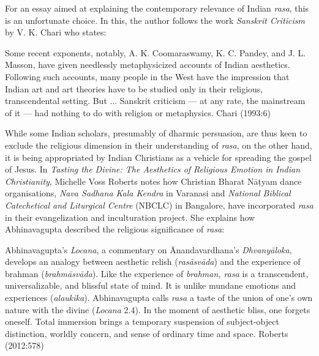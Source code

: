 For an essay aimed at explaining the contemporary relevance of Indian \textsl{rasa}, this is an unfortunate choice. In this, the author follows the work \textsl{Sanskrit Criticism} by V. K. Chari who states:

\begin{myquote}
Some recent exponents, notably, A. K. Coomaraswamy, K. C. Pandey, and J. L. Masson, have given needlessly metaphysicized accounts of Indian aesthetics. Following such accounts, many people in the West have the impression that Indian art and art theories have to be studied only in their religious, transcendental setting. But ... Sanskrit criticism --- at any rate, the mainstream of it --- had nothing to do with religion or metaphysics. 
\hfill Chari (1993:6)
\end{myquote}

While some Indian scholars, presumably of dharmic persuasion, are thus keen to exclude the religious dimension in their understanding of \textsl{rasa}, on the other hand, it is being appropriated by Indian Christians as a vehicle for spreading the gospel of Jesus. In \textsl{Tasting the Divine: The Aesthetics of Religious Emotion in Indian Christianity}, Michelle Voss Roberts notes how Christian Bharat Nāṭyam dance organisations, \textsl{Nava Sadhana Kala Kendra} in Varanasi and \textsl{National Biblical Catechetical and Liturgical Centre} (NBCLC) in Bangalore, have incorporated \textsl{rasa} in their evangelization and inculturation project. She explains how Abhinavagupta described the religious significance of \textsl{rasa}:

\begin{myquote}
Abhinavagupta's \textsl{Locana}, a commentary on Ānandavardhana's \textsl{Dhvanyāloka}, develops an analogy between aesthetic relish (\textsl{rasāsvāda}) and the experience of brahman (\textsl{brahmāsvāda}). Like the experience of \textsl{brahman, rasa} is a transcendent, universalizable, and blissful state of mind. It is unlike mundane emotions and experiences (\textsl{alaukika}). Abhinavagupta calls \textsl{rasa} a taste of the union of one's own nature with the divine (\textsl{Locana} 2.4). In the moment of aesthetic bliss, one forgets oneself. Total immersion brings a temporary suspension of subject-object distinction, worldly concern, and sense of ordinary time and space. 
\hfill Roberts (2012:578)
\end{myquote}

